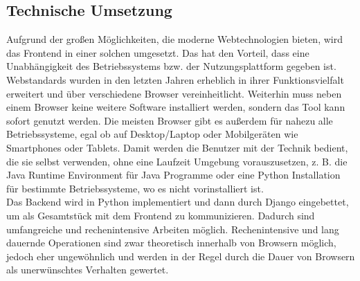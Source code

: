 \subsection{Technische Umsetzung}
Aufgrund der großen Möglichkeiten, die moderne Webtechnologien bieten, wird das
Frontend in einer solchen umgesetzt. Das hat den Vorteil, dass eine
Unabhängigkeit des Betriebssystems bzw. der Nutzungsplattform gegeben ist. Webstandards wurden in
den letzten Jahren erheblich in ihrer Funktionsvielfalt erweitert und über
verschiedene Browser vereinheitlicht. Weiterhin muss neben einem Browser keine
weitere Software installiert werden, sondern das Tool kann sofort genutzt
werden. Die meisten Browser gibt es außerdem für nahezu alle Betriebssysteme,
egal ob auf Desktop/Laptop oder Mobilgeräten wie Smartphones oder Tablets. Damit
werden die Benutzer mit der Technik bedient, die sie selbst verwenden, ohne
eine Laufzeit Umgebung vorauszusetzen, z. B. die Java Runtime Environment für
Java Programme oder eine Python Installation für bestimmte
Betriebssysteme, wo es nicht vorinstalliert ist.\\
Das Backend wird in Python implementiert und dann durch Django eingebettet, um
als Gesamtstück mit dem Frontend zu kommunizieren. Dadurch sind umfangreiche und
rechenintensive Arbeiten möglich. Rechenintensive und lang dauernde Operationen
sind zwar theoretisch innerhalb von Browsern möglich, jedoch eher ungewöhnlich und
werden in der Regel durch die Dauer von Browsern als
unerwünschtes Verhalten gewertet.

\pagebreak[4]